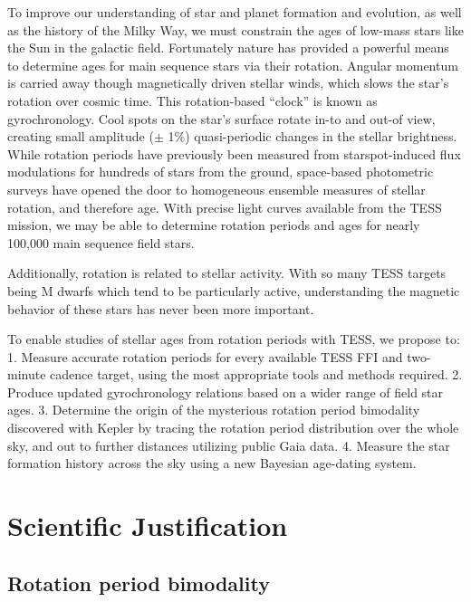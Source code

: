 \documentclass[useAMS, usenatbib, preprint, 12pt]{aastex}
\begin{document}
To improve our understanding of star and planet formation and evolution, as
well as the history of the Milky Way, we must constrain the ages of low-mass
stars like the Sun in the galactic field.
Fortunately nature has provided a powerful means to determine ages for main
sequence stars via their rotation.
Angular momentum is carried away though magnetically driven stellar winds,
which slows the star’s rotation over cosmic time. This rotation-based “clock”
is known as gyrochronology.
Cool spots on the star’s surface rotate in-to and out-of view, creating small
amplitude ($\pm$ 1\%) quasi-periodic changes in the stellar brightness.
While rotation periods have previously been measured from starspot-induced
flux modulations for hundreds of stars from the ground, space-based
photometric surveys have opened the door to homogeneous ensemble measures of
stellar rotation, and therefore age.
With precise light curves available from the TESS mission, we may be able to
determine rotation periods and ages for nearly 100,000 main sequence field
stars.

Additionally, rotation is related to stellar activity.
With so many TESS targets being M dwarfs which tend to be particularly active,
understanding the magnetic behavior of these stars has never been more
important.

To enable studies of stellar ages from rotation periods with TESS, we propose
to: 1. Measure accurate rotation periods for every available TESS FFI and
two-minute cadence target, using the most appropriate tools and methods
required.
2. Produce updated gyrochronology relations based on a wider range of field
star ages.
3. Determine the origin of the mysterious rotation period bimodality
discovered with Kepler by tracing the rotation period distribution over the
whole sky, and out to further distances utilizing public Gaia data.
4. Measure the star formation history across the sky using a new Bayesian
age-dating system.

\section{Scientific Justification}
\subsection{Rotation period bimodality}
\end{document}
